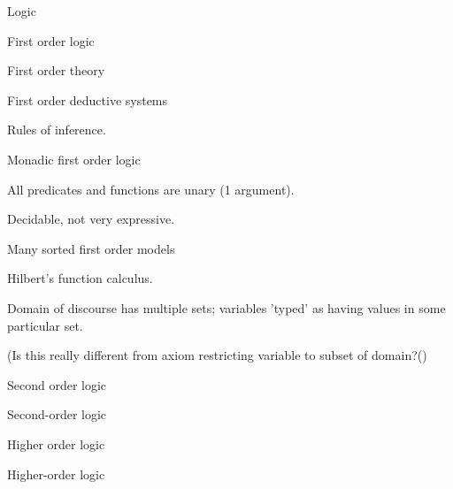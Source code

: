 \begin{plSection}{Logic}
\begin{plSection}{First order logic}
\begin{plSection}{First order theory}
\end{plSection}%
\begin{plSection}{First order deductive systems}
\label{sec:First_order_deductive_systems}

Rules of inference.

\end{plSection}%
\begin{plSection}{Monadic first order logic}
\label{sec:Monadic_first_order_logic}

All predicates and functions are unary 
(1 argument).~

Decidable, not very expressive.

\end{plSection}%
\begin{plSection}{Many sorted first order models}
\label{sec:Many_sorted_first_order_models}

Hilbert's function calculus.~

Domain of discourse has multiple sets;
variables 'typed' as having values in some particular 
set.~

(Is this really different from
axiom restricting variable to subset of domain?()

\end{plSection}%
\end{plSection}%
\begin{plSection}{Second order logic}
\label{sec:Second_order_logic}

Second-order logic~

\end{plSection}%
\begin{plSection}{Higher order logic}
\label{sec:Higher_order_logic}

Higher-order logic~


\end{plSection}
\end{plSection}
